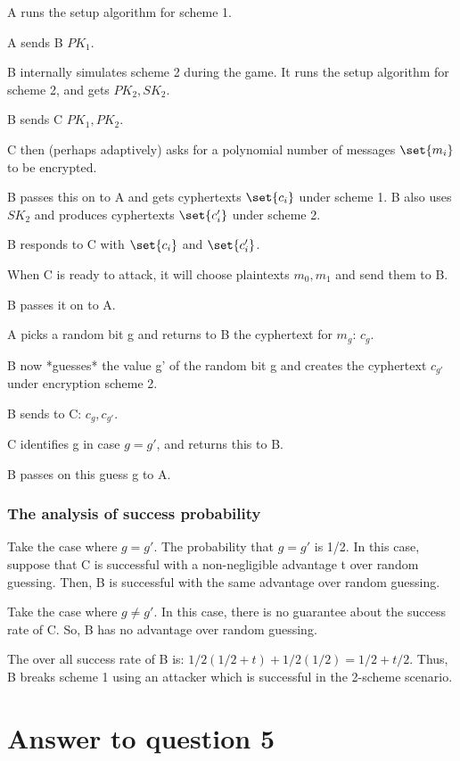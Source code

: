 \documentclass[10pt]{amsart}
\begin{document}
A runs the setup algorithm for scheme 1.

A sends B $PK_{1}$.

B internally simulates scheme 2 during the game. It runs the setup algorithm for scheme 2, and gets $PK_{2}, SK_{2}$.

B sends C $PK_{1}, PK_{2}$.

C then (perhaps adaptively) asks for a polynomial number of messages $\set{m_{i}}$ to be encrypted.

B passes this on to A and gets cyphertexts $\set{c_{i}}$ under scheme 1. B also uses $SK_2$ and produces cyphertexts $\set{c_{i}'}$ under scheme 2.

B responds to C with $\set{c_{i}}$ and $\set{c_{i}'}$.

When C is ready to attack, it will choose plaintexts $m_{0}, m_{1}$ and send them to B.

B passes it on to A.

A picks a random bit g and returns to B the cyphertext for $m_g$: $c_g$.

B now *guesses* the value g' of the random bit g and creates the cyphertext $c_{g'}$ under encryption scheme 2.

B sends to C: $c_g, c_{g'}$.

C identifies g in case $g = g'$, and returns this to B.

B passes on this guess g to A.

\subsubsection{The analysis of success probability}
Take the case where $g = g'$. The probability that $g = g'$ is 1/2. In this case, suppose that C is successful with a non-negligible advantage t over random guessing. Then, B is successful with the same advantage over random guessing.

Take the case where $g \neq g'$. In this case, there is no guarantee about the success rate of C. So, B has no advantage over random guessing.

The over all success rate of B is: $1/2(1/2 + t) + 1/2(1/2) = 1/2 + t/2$. Thus, B breaks scheme 1 using an attacker which is successful in the 2-scheme scenario.

\section{Answer to question 5}
\tbc


% 
% 
\end{document}

